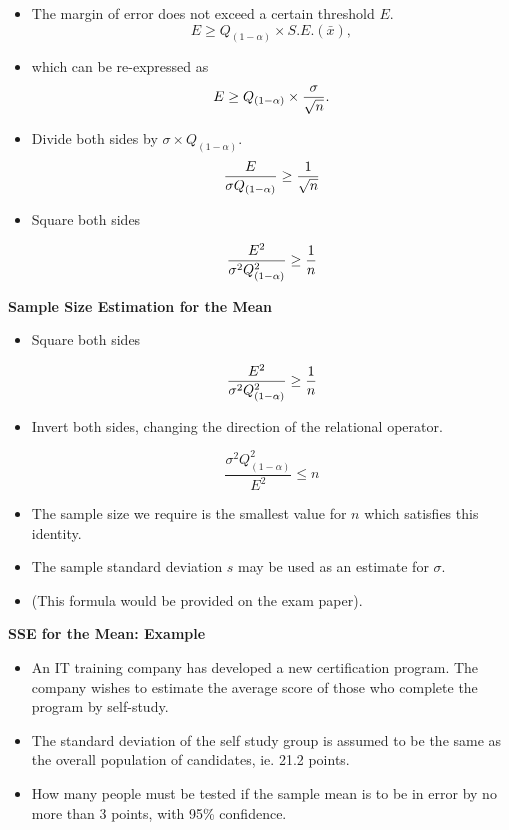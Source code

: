 \documentclass[]{report}
\begin{document}
\begin{itemize}

\item The margin of error does not exceed a certain threshold $E$.
\[ E \geq Q_{(1-\alpha)} \times S.E.(\bar{x}), \]

\item which can be re-expressed as
\[E \geq Q_{(1-\alpha)} \times {\sigma \over \sqrt{n} }.\]

\item Divide both sides by $\sigma \times Q_{(1-\alpha)}$.
\[ \frac{E}{\sigma Q_{(1-\alpha)}} \geq {1 \over \sqrt{n} } \]

\item Square both sides

\[ \frac{E^2}{\sigma^2 Q_{(1-\alpha)}^2} \geq {1 \over n } \]


\end{itemize}


\textbf{Sample Size Estimation for the Mean}

\begin{itemize}
\item Square both sides

\[ \frac{E^2}{\sigma^2 Q^2_{(1-\alpha)}} \geq {1 \over n } \]

\item Invert both sides, changing the direction of the relational operator.

\[ \frac{\sigma^2 Q^2_{(1-\alpha)}}{E^2} \leq n \]


\item The sample size we require is the smallest value for $n$ which satisfies this identity.
\item The sample standard deviation $s$ may be used as an estimate for $\sigma$.
\item (This formula would be provided on the exam paper).
\end{itemize}





\textbf{SSE for the Mean: Example}

\begin{itemize}
\item An IT training company has developed a new certification program. The company wishes to estimate the average score of those who complete the program by self-study.  \item The standard deviation of the self study group is assumed to be the same as the overall population of candidates, ie. 21.2 points.
    \item How many people must be tested if the sample mean is to be in error by no more than 3 points, with 95\% confidence.
\end{itemize}
\end{document}
